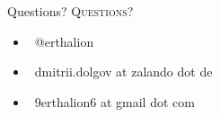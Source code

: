 \documentclass[usenames,dvipsnames, 18pt, compress, aspectratio=169]{beamer}
\def\twitter{{\FA \faTwitter}}
\def\email{{\FA \faEnvelope}}
\begin{document}
\fontsize{18pt}{18}\selectfont
\begin{frame}
  \vspace*{2.5cm}
  \begin{minipage}[b][\paperheight]{\textwidth}
  \begin{center}

      \linespread{1.0}%
      \if@noSmallCapitals%
        Questions?
      \else%
        \scshape{\color{black} Questions?}%
      \fi%
      \vspace*{0.3em}

      \fontsize{13pt}{14}\selectfont
        \begin{itemize}[label={}]
            \item {\color{black} \twitter\ @erthalion}
            \item {\color{black} \email\ dmitrii.dolgov at zalando dot de}
            \item {\color{black} \email\ 9erthalion6 at gmail dot com}
        \end{itemize}
      \vspace*{2.5em}%

    \vfill
    \vspace*{2em}
  \end{center}
  \end{minipage}

\end{frame}
\end{document}

